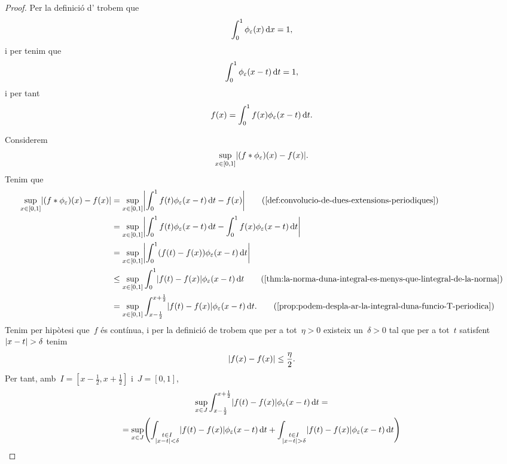 \documentclass[../analisi-matematica.tex]{subfiles}
\begin{document}
    \begin{proof}
        Per la definició d' trobem que
        \[
            \int_{0}^{1}\phi_{\varepsilon}(x)\mathop{}\!\mathrm{d} x=1,
        \]
        i per  tenim que
        \[
            \int_{0}^{1}\phi_{\varepsilon}(x-t)\mathop{}\!\mathrm{d} t=1,
        \]
        i per tant
        \[
            f(x)=\int_{0}^{1}f(x)\phi_{\varepsilon}(x-t)\mathop{}\!\mathrm{d} t.
        \]

        Considerem
        \[
            \sup_{x\in[0,1]}\abs{(f\convolucio\phi_{\varepsilon})(x)-f(x)}.
        \]
        Tenim que
        \begin{align*}
            \sup_{x\in[0,1]}\abs{(f\convolucio\phi_{\varepsilon})(x)-f(x)}&=\sup_{x\in[0,1]}\abs{\int_{0}^{1}f(t)\phi_{\varepsilon}(x-t)\diff t-f(x)} \tag{\ref{def:convolucio-de-dues-extensions-periodiques}} \\
            &=\sup_{x\in[0,1]}\abs{\int_{0}^{1}f(t)\phi_{\varepsilon}(x-t)\diff t-\int_{0}^{1}f(x)\phi_{\varepsilon}(x-t)\diff t} \\
            &=\sup_{x\in[0,1]}\abs{\int_{0}^{1}(f(t)-f(x))\phi_{\varepsilon}(x-t)\diff t} \\
            &\leq\sup_{x\in[0,1]}\int_{0}^{1}\abs{f(t)-f(x)}\phi_{\varepsilon}(x-t)\diff t \tag{\ref{thm:la-norma-duna-integral-es-menys-que-lintegral-de-la-norma}} \\
            &=\sup_{x\in[0,1]}\int_{x-\frac{1}{2}}^{x+\frac{1}{2}}\abs{f(t)-f(x)}\phi_{\varepsilon}(x-t)\diff t.
            \tag{\ref{prop:podem-despla-ar-la-integral-duna-funcio-T-periodica}}
        \end{align*}
         Tenim per hipòtesi que~\(f\) és contínua, i per la definició de  trobem que per a tot~\(\eta>0\) existeix un~\(\delta>0\) tal que per a tot~\(t\) satisfent~\(\abs{x-t}>\delta\) tenim
         \[
             \abs{f(x)-f(x)}\leq\frac{\eta}{2}.
         \]
         Per tant, amb~\(I=[x-\frac{1}{2},x+\frac{1}{2}]\) i~\(J=[0,1]\), %
         \begin{multline*}
             \sup_{x\in J}\int_{x-\frac{1}{2}}^{x+\frac{1}{2}}\abs{f(t)-f(x)}\phi_{\varepsilon}(x-t)\diff t = \\
             =\sup_{x\in J}\left(\int_{\substack{t\in I\\\abs{x-t}<\delta}}\abs{f(t)-f(x)}\phi_{\varepsilon}(x-t)\diff t+\int_{\substack{t\in I\\\abs{x-t}>\delta}}\abs{f(t)-f(x)}\phi_{\varepsilon}(x-t)\diff t\right) \hfill\\

\end{multline*}
\end{proof}
\end{document}
